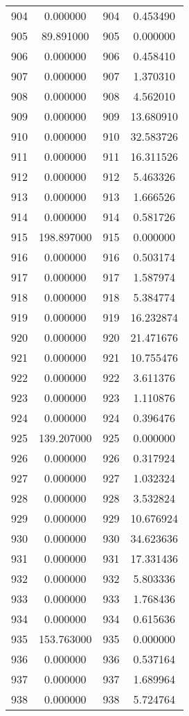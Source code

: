 \documentclass[12pt]{article}
\begin{document}
\begin{longtable}{@{}cccc@{}}
904 & 0.000000 & 904 & 0.453490 \\
905 & 89.891000 & 905 & 0.000000 \\
906 & 0.000000 & 906 & 0.458410 \\
907 & 0.000000 & 907 & 1.370310 \\
908 & 0.000000 & 908 & 4.562010 \\
909 & 0.000000 & 909 & 13.680910 \\
910 & 0.000000 & 910 & 32.583726 \\
911 & 0.000000 & 911 & 16.311526 \\
912 & 0.000000 & 912 & 5.463326 \\
913 & 0.000000 & 913 & 1.666526 \\
914 & 0.000000 & 914 & 0.581726 \\
915 & 198.897000 & 915 & 0.000000 \\
916 & 0.000000 & 916 & 0.503174 \\
917 & 0.000000 & 917 & 1.587974 \\
918 & 0.000000 & 918 & 5.384774 \\
919 & 0.000000 & 919 & 16.232874 \\
920 & 0.000000 & 920 & 21.471676 \\
921 & 0.000000 & 921 & 10.755476 \\
922 & 0.000000 & 922 & 3.611376 \\
923 & 0.000000 & 923 & 1.110876 \\
924 & 0.000000 & 924 & 0.396476 \\
925 & 139.207000 & 925 & 0.000000 \\
926 & 0.000000 & 926 & 0.317924 \\
927 & 0.000000 & 927 & 1.032324 \\
928 & 0.000000 & 928 & 3.532824 \\
929 & 0.000000 & 929 & 10.676924 \\
930 & 0.000000 & 930 & 34.623636 \\
931 & 0.000000 & 931 & 17.331436 \\
932 & 0.000000 & 932 & 5.803336 \\
933 & 0.000000 & 933 & 1.768436 \\
934 & 0.000000 & 934 & 0.615636 \\
935 & 153.763000 & 935 & 0.000000 \\
936 & 0.000000 & 936 & 0.537164 \\
937 & 0.000000 & 937 & 1.689964 \\
938 & 0.000000 & 938 & 5.724764 \\

\end{longtable}
\end{document}
